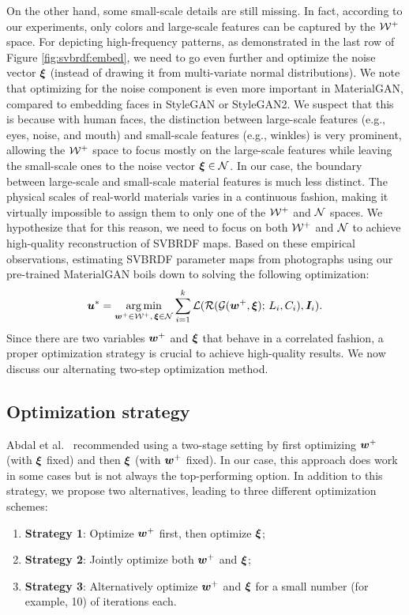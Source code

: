 

On the other hand, some small-scale details are still missing.
In fact, according to our experiments, only colors and large-scale features can be captured by the $\mathcal{W}^+$ space.
For depicting high-frequency patterns, as demonstrated in the last row of Figure \ref{fig:svbrdf:embed}, we need to go even further and optimize the noise vector $\bm\xi$ (instead of drawing it from multi-variate normal distributions).
We note that optimizing for the noise component is even more important in MaterialGAN, compared to embedding faces in StyleGAN or StyleGAN2.
We suspect that this is because with human faces, the distinction between large-scale features (e.g., eyes, noise, and mouth) and small-scale features (e.g., winkles) is very prominent, allowing the $\mathcal{W}^+$ space to focus mostly on the large-scale features while leaving the small-scale ones to the noise vector $\bm\xi \in \mathcal{N}$.
In our case, the boundary between large-scale and small-scale material features is much less distinct.
The physical scales of real-world materials varies in a continuous fashion, making it virtually impossible to assign them to only one of the $\mathcal{W}^+$ and $\mathcal{N}$ spaces.
We hypothesize that for this reason, we need to focus on both $\mathcal{W}^+$ and $\mathcal{N}$ to achieve high-quality reconstruction of SVBRDF maps.
Based on these empirical observations, estimating SVBRDF parameter maps from photographs using our pre-trained MaterialGAN boils down to solving the following optimization:
\begin{equation}
	\bm{u}^* = \operatorname*{arg\,min}_{\bm{w}^+ \in \mathcal{W}^+,\, \bm\xi \in \mathcal{N}} \sum_{i=1}^k \mathcal{L}(\mathcal{R}(\mathcal{G}(\bm{w}^+, \bm\xi); \,L_i, C_i), \bm{I}_i).
\end{equation}
Since there are two variables $\bm{w}^+$ and $\bm\xi$ that behave in a correlated fashion, a proper optimization strategy is crucial to achieve high-quality results. We now discuss our alternating two-step optimization method.

\subsection{Optimization strategy}
\label{ssec:optim}

Abdal et al.~\cite{abdal2019image2stylegan,abdal2020image2stylegan++} recommended using a two-stage setting by first optimizing $\bm{w}^+$ (with $\bm\xi$ fixed) and then $\bm\xi$ (with $\bm{w}^+$ fixed).
In our case, this approach does work in some cases but is not always the top-performing option.
In addition to this strategy, we propose two alternatives, leading to three different optimization schemes:
\begin{enumerate}
	\item \textbf{Strategy 1}: Optimize $\bm{w}^+$ first, then optimize $\bm\xi$;
	\item \textbf{Strategy 2}: Jointly optimize both $\bm{w}^+$ and $\bm\xi$;
	\item \textbf{Strategy 3}: Alternatively optimize $\bm{w}^+$ and $\bm\xi$ for a small number (for example, 10) of iterations each.
\end{enumerate}

